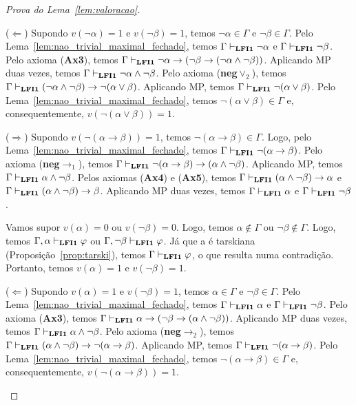 \begin{proof}[Prova do Lema~\ref{lem:valoracao}]
\begin{provaporcasos}
\begin{adjustwidth}{1cm}{}
                        \noindent ($\Longleftarrow$) Supondo $v(\neg \alpha) = 1$ e $v(\neg \beta) = 1$, temos $\neg \alpha \in \Gamma$ e $\neg \beta \in \Gamma$. Pelo Lema~\ref{lem:nao_trivial_maximal_fechado}, temos $\Gamma \vdash_{{\normalfont\textbf{LFI1}}{}} \neg \alpha$ e $\Gamma \vdash_{{\normalfont\textbf{LFI1}}{}} \neg \beta$. Pelo axioma (\textbf{Ax3}), temos $\Gamma \vdash_{{\normalfont\textbf{LFI1}}{}} \neg \alpha \to (\neg \beta \to (\neg \alpha \land \neg \beta))$. Aplicando MP duas vezes, temos $\Gamma \vdash_{{\normalfont\textbf{LFI1}}{}} \neg \alpha \land \neg \beta$. Pelo axioma (\textbf{neg}$\lor_2$), temos $\Gamma \vdash_{{\normalfont\textbf{LFI1}}{}} (\neg \alpha \land \neg \beta) \to \neg (\alpha \lor \beta)$. Aplicando MP, temos $\Gamma \vdash_{{\normalfont\textbf{LFI1}}{}} \neg (\alpha \lor \beta)$. Pelo Lema~\ref{lem:nao_trivial_maximal_fechado}, temos $\neg (\alpha \lor \beta) \in \Gamma$ e, consequentemente, $v(\neg (\alpha \lor \beta)) = 1$.

                    \end{adjustwidth}


                    \begin{adjustwidth}{1cm}{}
                        
                        \noindent ($\Longrightarrow$) Supondo $v(\neg (\alpha \to \beta)) = 1$, temos $\neg (\alpha \to \beta) \in \Gamma$. Logo, pelo Lema~\ref{lem:nao_trivial_maximal_fechado}, temos $\Gamma \vdash_{{\normalfont\textbf{LFI1}}{}} \neg (\alpha \to \beta)$. Pelo axioma (\textbf{neg}$\to_1$), temos $\Gamma \vdash_{{\normalfont\textbf{LFI1}}{}} \neg (\alpha \to \beta) \to (\alpha \land \neg \beta)$. Aplicando MP, temos $\Gamma \vdash_{{\normalfont\textbf{LFI1}}{}} \alpha \land \neg \beta$. Pelos axiomas (\textbf{Ax4}) e (\textbf{Ax5}), temos $\Gamma \vdash_{{\normalfont\textbf{LFI1}}{}} (\alpha \land \neg \beta) \to \alpha$ e $\Gamma \vdash_{{\normalfont\textbf{LFI1}}{}} (\alpha \land \neg \beta) \to \beta$. Aplicando MP duas vezes, temos $\Gamma \vdash_{{\normalfont\textbf{LFI1}}{}} \alpha$ e $\Gamma \vdash_{{\normalfont\textbf{LFI1}}{}} \neg \beta$.

                        \noindent Vamos supor $v(\alpha) = 0$ ou $v(\neg \beta) = 0$. Logo, temos $\alpha \not \in \Gamma$ ou $\neg \beta \not \in \Gamma$. Logo, temos $\Gamma, \alpha \vdash_{{\normalfont\textbf{LFI1}}{}} \varphi$ ou $\Gamma, \neg \beta \vdash_{{\normalfont\textbf{LFI1}}{}} \varphi$. Já que a \lfium{} é tarskiana (Proposição~\ref{prop:tarski}), temos $\Gamma \vdash_{{\normalfont\textbf{LFI1}}{}} \varphi$, o que resulta numa contradição. Portanto, temos $v(\alpha) = 1$ e $v(\neg \beta) = 1$.

                        \noindent ($\Longleftarrow$) Supondo $v(\alpha) = 1$ e $v(\neg \beta) = 1$, temos $\alpha \in \Gamma$ e $\neg \beta \in \Gamma$. Pelo Lema~\ref{lem:nao_trivial_maximal_fechado}, temos $\Gamma \vdash_{{\normalfont\textbf{LFI1}}{}} \alpha$ e $\Gamma \vdash_{{\normalfont\textbf{LFI1}}{}} \neg \beta$. Pelo axioma (\textbf{Ax3}), temos $\Gamma \vdash_{{\normalfont\textbf{LFI1}}{}} \alpha \to (\neg \beta \to (\alpha \land \neg \beta))$. Aplicando MP duas vezes, temos $\Gamma \vdash_{{\normalfont\textbf{LFI1}}{}} \alpha \land \neg \beta$. Pelo axioma (\textbf{neg}$\to_2$), temos $\Gamma \vdash_{{\normalfont\textbf{LFI1}}{}} (\alpha \land \neg \beta) \to \neg (\alpha \to \beta)$. Aplicando MP, temos $\Gamma \vdash_{{\normalfont\textbf{LFI1}}{}} \neg (\alpha \to \beta)$. Pelo Lema~\ref{lem:nao_trivial_maximal_fechado}, temos $\neg (\alpha \to \beta) \in \Gamma$ e, consequentemente, $v(\neg (\alpha \to \beta)) = 1$.



\end{adjustwidth}
\end{provaporcasos}
\end{proof}

